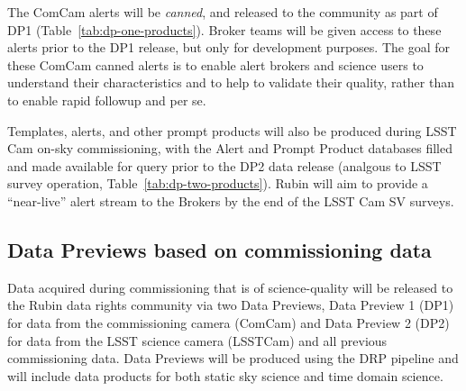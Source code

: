 The ComCam alerts will be {\it canned}, and released to the community as part of DP1 (Table~\ref{tab:dp-one-products}).
Broker teams will be given access to these alerts prior to the DP1 release, but only for development purposes.
The goal for these ComCam canned alerts is to enable alert brokers and science users to understand their characteristics and to help to validate their quality, rather than to enable rapid followup and \es per se.

Templates, alerts, and other prompt products will also be produced during LSST Cam on-sky commissioning, with the Alert and Prompt Product databases filled and made available for query prior to the DP2 data release (analgous to LSST survey operation, Table~\ref{tab:dp-two-products}). 
Rubin will aim to provide a ``near-live'' alert stream to the Brokers by the end of the LSST Cam SV surveys.


\subsection{Data Previews based on commissioning data}

Data acquired during commissioning that is of science-quality will be released to the Rubin data rights community via two Data Previews, Data Preview 1 (DP1) for data from the commissioning camera (ComCam) and Data Preview 2 (DP2) for data from the LSST science camera (LSSTCam) and all previous commissioning data.
Data Previews will be produced using the DRP pipeline and will include data products for both static sky science and time domain science.
